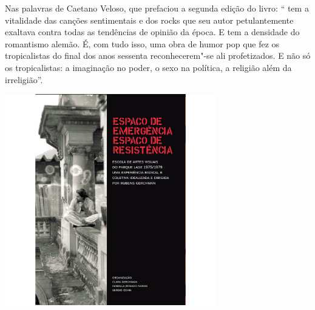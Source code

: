 Nas palavras de Caetano Veloso, que prefaciou a segunda edição do livro: “{} tem a vitalidade das canções sentimentais e dos rocks que seu autor petulantemente exaltava contra todas as tendências de opinião da época. E tem a densidade do romantismo alemão. É, com tudo isso, uma obra de humor pop que fez os tropicalistas do final dos anos sessenta reconhecerem"-se ali profetizados. E não só os tropicalistas: a imaginação no poder, o sexo na política, a religião além da irreligião”.


\vfill

\hspace*{-.4cm}\begin{minipage}[c]{.5\linewidth}
\small{
{}}
\end{minipage}

\pagebreak

\hspace{.5cm}

\begin{center}
\hspace*{-2.5cm}
\hspace*{2.5cm}\includegraphics[width=92mm]{./grid/lage.jpg}
\end{center}

